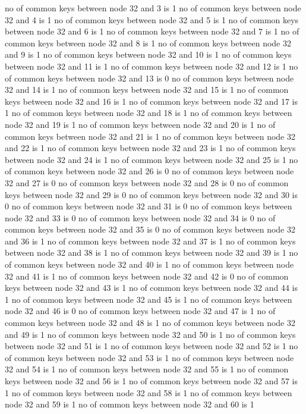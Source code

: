 no of common keys between node 32 and 3 is 1
no of common keys between node 32 and 4 is 1
no of common keys between node 32 and 5 is 1
no of common keys between node 32 and 6 is 1
no of common keys between node 32 and 7 is 1
no of common keys between node 32 and 8 is 1
no of common keys between node 32 and 9 is 1
no of common keys between node 32 and 10 is 1
no of common keys between node 32 and 11 is 1
no of common keys between node 32 and 12 is 1
no of common keys between node 32 and 13 is 0
no of common keys between node 32 and 14 is 1
no of common keys between node 32 and 15 is 1
no of common keys between node 32 and 16 is 1
no of common keys between node 32 and 17 is 1
no of common keys between node 32 and 18 is 1
no of common keys between node 32 and 19 is 1
no of common keys between node 32 and 20 is 1
no of common keys between node 32 and 21 is 1
no of common keys between node 32 and 22 is 1
no of common keys between node 32 and 23 is 1
no of common keys between node 32 and 24 is 1
no of common keys between node 32 and 25 is 1
no of common keys between node 32 and 26 is 0
no of common keys between node 32 and 27 is 0
no of common keys between node 32 and 28 is 0
no of common keys between node 32 and 29 is 0
no of common keys between node 32 and 30 is 0
no of common keys between node 32 and 31 is 0
no of common keys between node 32 and 33 is 0
no of common keys between node 32 and 34 is 0
no of common keys between node 32 and 35 is 0
no of common keys between node 32 and 36 is 1
no of common keys between node 32 and 37 is 1
no of common keys between node 32 and 38 is 1
no of common keys between node 32 and 39 is 1
no of common keys between node 32 and 40 is 1
no of common keys between node 32 and 41 is 1
no of common keys between node 32 and 42 is 0
no of common keys between node 32 and 43 is 1
no of common keys between node 32 and 44 is 1
no of common keys between node 32 and 45 is 1
no of common keys between node 32 and 46 is 0
no of common keys between node 32 and 47 is 1
no of common keys between node 32 and 48 is 1
no of common keys between node 32 and 49 is 1
no of common keys between node 32 and 50 is 1
no of common keys between node 32 and 51 is 1
no of common keys between node 32 and 52 is 1
no of common keys between node 32 and 53 is 1
no of common keys between node 32 and 54 is 1
no of common keys between node 32 and 55 is 1
no of common keys between node 32 and 56 is 1
no of common keys between node 32 and 57 is 1
no of common keys between node 32 and 58 is 1
no of common keys between node 32 and 59 is 1
no of common keys between node 32 and 60 is 1
